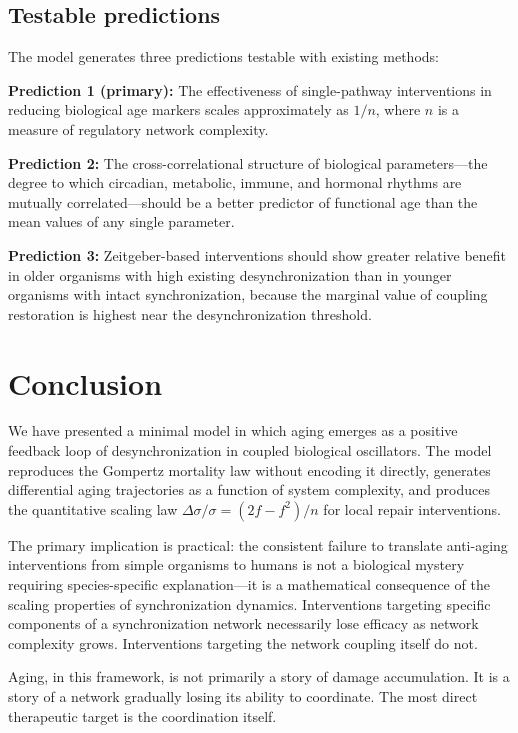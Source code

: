 \documentclass[12pt]{article}
\begin{document}
\subsection{Testable predictions}

The model generates three predictions testable with existing methods:

\textbf{Prediction 1 (primary):} The effectiveness of single-pathway
interventions in reducing biological age markers scales approximately as $1/n$,
where $n$ is a measure of regulatory network complexity.

\textbf{Prediction 2:} The cross-correlational structure of biological
parameters---the degree to which circadian, metabolic, immune, and hormonal
rhythms are mutually correlated---should be a better predictor of functional age
than the mean values of any single parameter.

\textbf{Prediction 3:} Zeitgeber-based interventions should show greater
relative benefit in older organisms with high existing desynchronization than in
younger organisms with intact synchronization, because the marginal value of
coupling restoration is highest near the desynchronization threshold.

\section{Conclusion}

We have presented a minimal model in which aging emerges as a positive feedback
loop of desynchronization in coupled biological oscillators. The model reproduces
the Gompertz mortality law without encoding it directly, generates differential
aging trajectories as a function of system complexity, and produces the
quantitative scaling law $\Delta\sigma/\sigma = (2f-f^2)/n$ for local repair
interventions.

The primary implication is practical: the consistent failure to translate
anti-aging interventions from simple organisms to humans is not a biological
mystery requiring species-specific explanation---it is a mathematical consequence
of the scaling properties of synchronization dynamics. Interventions targeting
specific components of a synchronization network necessarily lose efficacy as
network complexity grows. Interventions targeting the network coupling itself do
not.

Aging, in this framework, is not primarily a story of damage accumulation. It is
a story of a network gradually losing its ability to coordinate. The most direct
therapeutic target is the coordination itself.
\end{document}
